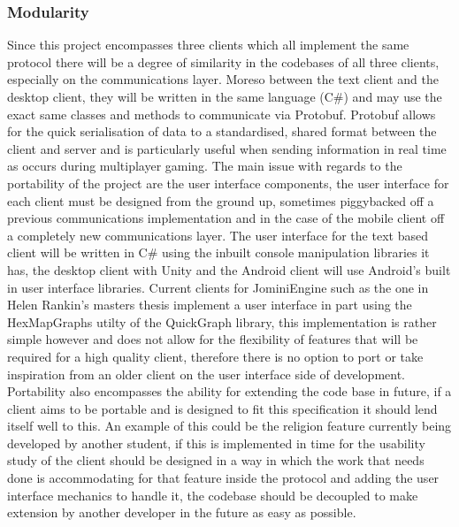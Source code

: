 \documentclass{article}
\begin{document}
    \subsubsection{Modularity}
    Since this project encompasses three clients which all implement the same protocol there will be a degree of similarity in the codebases of all three clients, especially on the communications layer. Moreso between the text client and the desktop client, they will be written in the same language (C\#) and may use the exact same classes and methods to communicate via Protobuf\cite{Protobuf}. Protobuf allows for the quick serialisation of data to a standardised, shared format between the client and server and is particularly useful when sending information in real time as occurs during multiplayer gaming. The main issue with regards to the portability of the project are the user interface components, the user interface for each client must be designed from the ground up, sometimes piggybacked off a previous communications implementation and in the case of the mobile client off a completely new communications layer. The user interface for the text based client will be written in C\# using the inbuilt console manipulation libraries it has\cite{ConsoleClass}, the desktop client with Unity\cite{Unity3D} and the Android client will use Android's built in user interface libraries\cite{AndroidUI}. Current clients for JominiEngine such as the one in Helen Rankin's masters thesis\cite{helenrankin} implement a user interface in part using the HexMapGraphs utilty of the QuickGraph library\cite{QuickGraph}, this implementation is rather simple however and does not allow for the flexibility of features that will be required for a high quality client, therefore there is no option to port or take inspiration from an older client on the user interface side of development. Portability also encompasses the ability for extending the code base in future, if a client aims to be portable and is designed to fit this specification it should lend itself well to this. An example of this could be the religion feature currently being developed by another student, if this is implemented in time for the usability study of the client should be designed in a way in which the work that needs done is accommodating for that feature inside the protocol and adding the user interface mechanics to handle it, the codebase should be decoupled to make extension by another developer in the future as easy as possible. 
\end{document}
